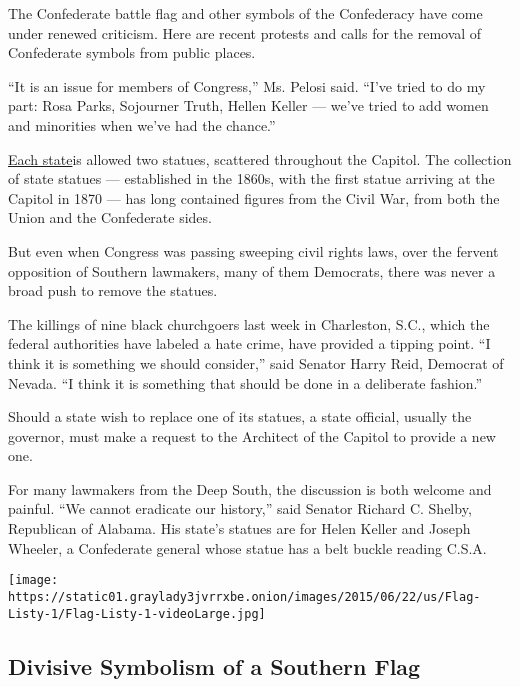 The Confederate battle flag and other symbols of the Confederacy have
come under renewed criticism. Here are recent protests and calls for the
removal of Confederate symbols from public places.

``It is an issue for members of Congress,'' Ms. Pelosi said. ``I've
tried to do my part: Rosa Parks, Sojourner Truth, Hellen Keller ---
we've tried to add women and minorities when we've had the chance.''

\href{http://www.aoc.gov/capitol-hill/national-statuary-hall-collection/nsh-location.}{Each
state}is allowed two statues, scattered throughout the Capitol. The
collection of state statues --- established in the 1860s, with the first
statue arriving at the Capitol in 1870 --- has long contained figures
from the Civil War, from both the Union and the Confederate sides.

But even when Congress was passing sweeping civil rights laws, over the
fervent opposition of Southern lawmakers, many of them Democrats, there
was never a broad push to remove the statues.

The killings of nine black churchgoers last week in Charleston, S.C.,
which the federal authorities have labeled a hate crime, have provided a
tipping point. ``I think it is something we should consider,'' said
Senator Harry Reid, Democrat of Nevada. ``I think it is something that
should be done in a deliberate fashion.''

Should a state wish to replace one of its statues, a state official,
usually the governor, must make a request to the Architect of the
Capitol to provide a new one.

For many lawmakers from the Deep South, the discussion is both welcome
and painful. ``We cannot eradicate our history,'' said Senator Richard
C. Shelby, Republican of Alabama. His state's statues are for Helen
Keller and Joseph Wheeler, a Confederate general whose statue has a belt
buckle reading C.S.A.

\href{https://www.nytimes3xbfgragh.onion/interactive/2015/06/22/us/Divisive-Symbolism-of-a-Southern-Flag.html}{}

\texttt{[image: https://static01.graylady3jvrrxbe.onion/images/2015/06/22/us/Flag-Listy-1/Flag-Listy-1-videoLarge.jpg]}

\hypertarget{divisive-symbolism-of-a-southern-flag}{%
\subsection{Divisive Symbolism of a Southern
Flag}\label{divisive-symbolism-of-a-southern-flag}}

